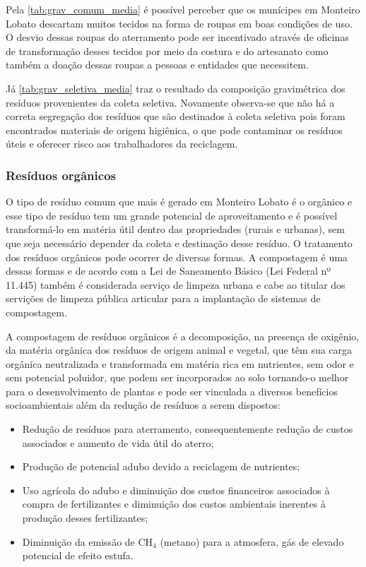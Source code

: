 Pela \autoref{tab:grav_comum_media} é possível perceber que os munícipes em Monteiro Lobato descartam muitos tecidos na forma de roupas em boas condições de uso. O desvio dessas roupas do aterramento pode ser incentivado através de oficinas de transformação desses tecidos por meio da costura e do artesanato como também a doação dessas roupas a pessoas e entidades que necessitem.  

Já \autoref{tab:grav_seletiva_media} traz o resultado da composição gravimétrica dos resíduos provenientes da coleta seletiva. Novamente observa-se que não há a correta segregação dos resíduos que são destinados à coleta seletiva pois foram encontrados materiais de origem higiênica, o que pode contaminar os resíduos úteis e oferecer risco aos trabalhadores da reciclagem. 



\subsubsection{Resíduos orgânicos}

O tipo de resíduo comum que mais é gerado em Monteiro Lobato é o orgânico e esse tipo de resíduo tem um grande potencial de aproveitamento e é possível transformá-lo em matéria útil dentro das propriedades (rurais e urbanas), sem que seja necessário depender da coleta e destinação desse resíduo. O tratamento dos resíduos orgânicos pode ocorrer de diversas formas. A compostagem é uma dessas formas e de acordo com a Lei de Saneamento Básico (Lei Federal nº 11.445) também é considerada serviço de limpeza urbana e cabe ao titular dos servições de limpeza pública articular para a implantação de sistemas de compostagem.

A compostagem de resíduos orgânicos é a decomposição, na presença de oxigênio, da matéria orgânica dos resíduos de origem animal e vegetal, que têm sua carga orgânica neutralizada e transformada em matéria rica em nutrientes, sem odor e sem potencial poluidor, que podem ser incorporados ao solo tornando-o melhor para o desenvolvimento de plantas e pode ser vinculada a diversos benefícios socioambientais além da redução de resíduos a serem dispostos:

\begin{itemize}
	\item Redução de resíduos para aterramento, consequentemente redução de custos associados e aumento de vida útil do aterro;
	\item Produção de potencial adubo devido a reciclagem de nutrientes;
	\item Uso agrícola do adubo e diminuição dos custos financeiros associados à compra de fertilizantes e diminuição dos custos ambientais inerentes à produção desses fertilizantes;
	\item Diminuição da emissão de CH$_{4}$ (metano) para a atmosfera, gás de elevado potencial de efeito estufa. 
\end{itemize}

